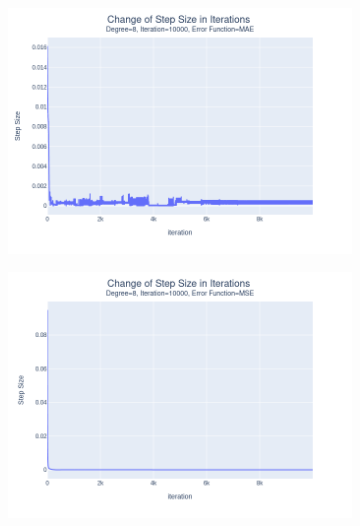 \documentclass[14pt,a4]{article}
\begin{document}
\begin{figure}[h]
\begin{subfigure}{0.3\linewidth}
    \end{subfigure}
    \newline
    \begin{subfigure}{0.3\linewidth}
        \centering
        \includegraphics[width=\textwidth]{images/implementation/q1/part_d/step_size/8_10000_MAE.png}
    \end{subfigure}
    \hfill
    \begin{subfigure}{0.3\textwidth}
        \centering
        \includegraphics[width=\textwidth]{images/implementation/q1/part_d/step_size/8_10000_MSE.png}
    \end{subfigure}
    \hfill
    \begin{subfigure}{0.3\linewidth}
        \centering

\end{subfigure}
\end{figure}
\end{document}
